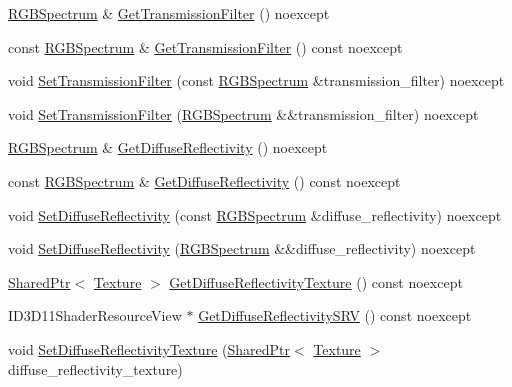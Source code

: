 \begin{DoxyCompactItemize}
\item 
\hyperlink{structmage_1_1_r_g_b_spectrum}{R\+G\+B\+Spectrum} \& \hyperlink{structmage_1_1_material_aba949cb74176530638c7bcb100882196}{Get\+Transmission\+Filter} () noexcept
\item 
const \hyperlink{structmage_1_1_r_g_b_spectrum}{R\+G\+B\+Spectrum} \& \hyperlink{structmage_1_1_material_a38071483e6d47eedb02b2e5c912073e7}{Get\+Transmission\+Filter} () const noexcept
\item 
void \hyperlink{structmage_1_1_material_afe8121e13eb9fff9ffb281e7c807f2e0}{Set\+Transmission\+Filter} (const \hyperlink{structmage_1_1_r_g_b_spectrum}{R\+G\+B\+Spectrum} \&transmission\+\_\+filter) noexcept
\item 
void \hyperlink{structmage_1_1_material_abc6f63bd40b00c81bc799ef1f2ca01e9}{Set\+Transmission\+Filter} (\hyperlink{structmage_1_1_r_g_b_spectrum}{R\+G\+B\+Spectrum} \&\&transmission\+\_\+filter) noexcept
\item 
\hyperlink{structmage_1_1_r_g_b_spectrum}{R\+G\+B\+Spectrum} \& \hyperlink{structmage_1_1_material_afb37e1cd37df82b6607a4e5998e58ea8}{Get\+Diffuse\+Reflectivity} () noexcept
\item 
const \hyperlink{structmage_1_1_r_g_b_spectrum}{R\+G\+B\+Spectrum} \& \hyperlink{structmage_1_1_material_a046b0d8eece74bd68538fefd03c1f294}{Get\+Diffuse\+Reflectivity} () const noexcept
\item 
void \hyperlink{structmage_1_1_material_aef82ef4eba08eabc31989144316a57c6}{Set\+Diffuse\+Reflectivity} (const \hyperlink{structmage_1_1_r_g_b_spectrum}{R\+G\+B\+Spectrum} \&diffuse\+\_\+reflectivity) noexcept
\item 
void \hyperlink{structmage_1_1_material_a83281d9408fcdc3c6de6804f31a527b3}{Set\+Diffuse\+Reflectivity} (\hyperlink{structmage_1_1_r_g_b_spectrum}{R\+G\+B\+Spectrum} \&\&diffuse\+\_\+reflectivity) noexcept
\item 
\hyperlink{namespacemage_a1e01ae66713838a7a67d30e44c67703e}{Shared\+Ptr}$<$ \hyperlink{classmage_1_1_texture}{Texture} $>$ \hyperlink{structmage_1_1_material_a3b4de7dc988c91eb3ce7ea715d98b758}{Get\+Diffuse\+Reflectivity\+Texture} () const noexcept
\item 
I\+D3\+D11\+Shader\+Resource\+View $\ast$ \hyperlink{structmage_1_1_material_a20c4db65d5fb89178c0f6b6db2f87cda}{Get\+Diffuse\+Reflectivity\+S\+RV} () const noexcept
\item 
void \hyperlink{structmage_1_1_material_a32e02c92dfd73db1a8a809a45546dc87}{Set\+Diffuse\+Reflectivity\+Texture} (\hyperlink{namespacemage_a1e01ae66713838a7a67d30e44c67703e}{Shared\+Ptr}$<$ \hyperlink{classmage_1_1_texture}{Texture} $>$ diffuse\+\_\+reflectivity\+\_\+texture)

\end{DoxyCompactItemize}
